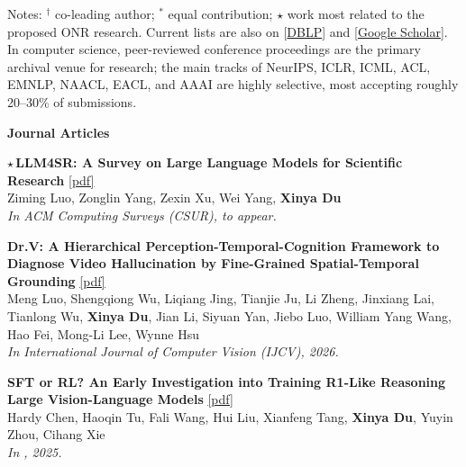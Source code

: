 \noindent Notes: $^{\dagger}$ co-leading author; $^{*}$ equal contribution; $\star$ work most related to the proposed ONR research. Current lists are also on [\href{https://dblp.org/pid/200/8114.html}{DBLP}] and [\href{https://scholar.google.com/citations?hl=en&user=R-lKQqkAAAAJ&view_op=list_works&sortby=pubdate}{Google Scholar}]. In computer science, peer-reviewed conference proceedings are the primary archival venue for research; the main tracks of NeurIPS, ICLR, ICML, ACL, EMNLP, NAACL, EACL, and AAAI are highly selective, most accepting roughly 20--30\% of submissions.
\vspace{1mm}

\vspace{1.5mm}
\noindent \textbf{Journal Articles}
\begin{enumerate}[{[}1{]},leftmargin=*]

\parbox{\linewidth}{
\item\label{pub:llm4sr}
$\star$\,{\bf LLM4SR: A Survey on Large Language Models for Scientific Research}
\href{https://arxiv.org/abs/2501.04306}{{{[pdf]}}} \\
Ziming Luo, Zonglin Yang, Zexin Xu, Wei Yang, \textbf{Xinya Du} \\
{\it In ACM Computing Surveys (CSUR), to appear.} \\
}

\parbox{\linewidth}{
\item
{\bf Dr.V: A Hierarchical Perception-Temporal-Cognition Framework to Diagnose Video Hallucination by Fine-Grained Spatial-Temporal Grounding}
\href{https://arxiv.org/abs/2509.11866}{{{[pdf]}}} \\
Meng Luo, Shengqiong Wu, Liqiang Jing, Tianjie Ju, Li Zheng, Jinxiang Lai, Tianlong Wu, \textbf{Xinya Du}, Jian Li, Siyuan Yan, Jiebo Luo, William Yang Wang, Hao Fei, Mong-Li Lee, Wynne Hsu \\
{\it In International Journal of Computer Vision (IJCV), 2026.} \\
}

\parbox{\linewidth}{
\item\label{pub:sftrl}
 
{\bf SFT or RL? An Early Investigation into Training R1-Like Reasoning Large Vision-Language Models} 
\href{https://openreview.net/pdf?id=wZI5qkQeDF}{{{[pdf]}}} \\
     Hardy Chen, Haoqin Tu, Fali Wang, Hui Liu, Xianfeng Tang, \textbf{Xinya Du}, Yuyin Zhou, Cihang Xie \\
{\it In \TMLR, 2025.} \\
}


\end{enumerate}
